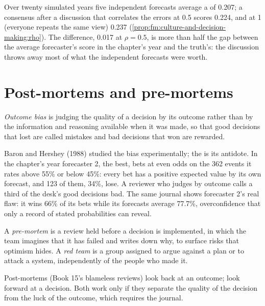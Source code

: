 Over twenty simulated years five independent forecasts average a  of 0.207; a consensus after a discussion that correlates the errors at
0.5 scores 0.224, and at 1 (everyone repeats the same view) 0.237 (\cref{prop:fm:culture-and-decision-making:rho}). The difference, 0.017 at
$\rho=0.5$, is more than half the gap between the average forecaster's score in the chapter's year and the truth's: the discussion throws away most of what the independent
forecasts were worth.

\section{Post-mortems and pre-mortems}

\begin{definition}\label{def:fm:culture-and-decision-making:outcome}
\emph{Outcome bias} is judging the quality of a decision by its outcome rather than by the information and reasoning available
when it was made, so that good decisions that lost are called mistakes and bad decisions that won are rewarded.
\end{definition}

Baron and Hershey (1988) studied the bias experimentally; the  is its antidote. In the chapter's year forecaster 2, the best, bets at
even odds on the 362 events it rates above 55\% or below 45\%: every bet has a positive expected value by its own forecast, and 123 of them, 34\%,
lose. A reviewer who judges by outcome calls a third of the desk's good decisions bad. The same journal shows forecaster 2's real flaw: it wins
66\% of its bets while its forecasts average 77.7\%, overconfidence that only a record of stated probabilities can reveal.

\begin{definition}\label{def:fm:culture-and-decision-making:premortem}
A \emph{pre-mortem} is a review held before a decision is implemented, in which the team imagines that it has failed and writes
down why, to surface risks that optimism hides. A \emph{red team} is a group assigned to argue against a plan or to attack a
system, independently of the people who made it.
\end{definition}

Post-mortems (Book 15's blameless reviews) look back at an outcome;  look forward at a decision. Both work only if they separate the
quality of the decision from the luck of the outcome, which requires the journal.

